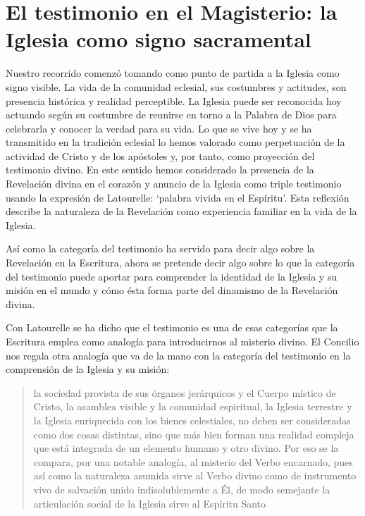 \section{El testimonio en el Magisterio: la Iglesia como signo sacramental}

Nuestro recorrido comenzó tomando como punto de partida a la Iglesia como signo visible. La vida de la comunidad eclesial, sus costumbres y actitudes, son presencia histórica y realidad perceptible. La Iglesia puede ser reconocida hoy actuando según su costumbre de reunirse en torno a la Palabra de Dios para celebrarla y conocer la verdad para su vida. Lo que se vive hoy y se ha transmitido en la tradición eclesial lo hemos valorado como perpetuación de la actividad de Cristo y de los apóstoles y, por tanto, como proyección del testimonio divino. En este sentido hemos considerado la presencia de la Revelación divina en el corazón y anuncio de la Iglesia como triple testimonio usando la expresión de Latourelle: \enquote*{palabra vivida en el Espíritu}. Esta reflexión describe la naturaleza de la Revelación como experiencia familiar en la vida de la Iglesia.

Así como la categoría del testimonio ha servido para decir algo sobre la Revelación en la Escritura, ahora se pretende decir algo sobre lo que la categoría del testimonio puede aportar para comprender la identidad de la Iglesia y su misión en el mundo y cómo ésta forma parte del dinamismo de la Revelación divina.

Con Latourelle se ha dicho que el testimonio es una de esas categorías que la Escritura emplea como analogía para introducirnos al misterio divino. El Concilio nos regala otra analogía que va de la mano con la categoría del testimonio en la comprensión de la Iglesia y su misión: \blockquote[][\,(LG 8)]{la sociedad provista de sus órganos jerárquicos y el Cuerpo místico de Cristo, la asamblea visible y la comunidad espiritual, la Iglesia terrestre y la Iglesia enriquecida con los bienes celestiales, no deben ser consideradas como dos cosas distintas, sino que más bien forman una realidad compleja que está integrada de un elemento humano y otro divino. Por eso se la compara, por una notable analogía, al misterio del Verbo encarnado, pues así como la naturaleza asumida sirve al Verbo divino como de instrumento vivo de salvación unido indisolublemente a Él, de modo semejante la articulación social de la Iglesia sirve al Espíritu Santo}.

